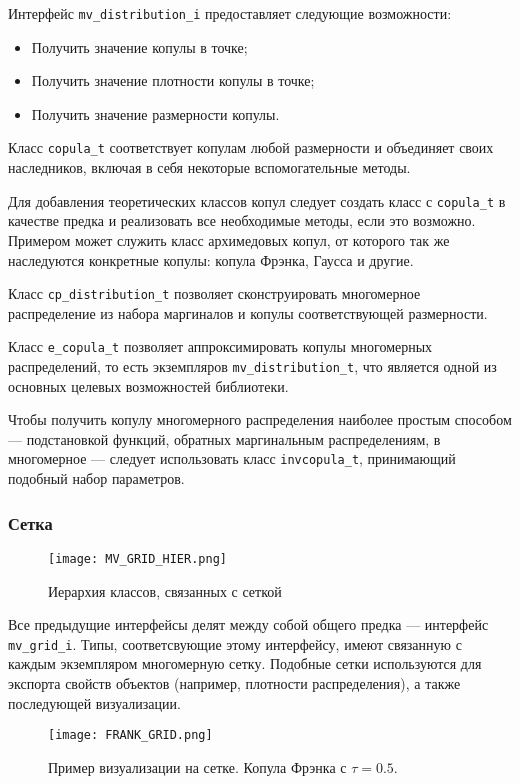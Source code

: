 Интерфейс \texttt{mv\_distribution\_i} предоставляет следующие возможности:
\begin{itemize}
  \item Получить значение копулы в точке;
  \item Получить значение плотности копулы в точке;
  \item Получить значение размерности копулы.
\end{itemize}

Класс \texttt{copula\_t} соответствует копулам любой размерности и объединяет своих наследников, включая в себя некоторые вспомогательные методы.

Для добавления теоретических классов копул следует создать класс с \texttt{copula\_t} в качестве предка и реализовать все необходимые методы, если это возможно. Примером может служить класс архимедовых копул, от которого так же наследуются конкретные копулы: копула Фрэнка, Гаусса и другие.

Класс \texttt{cp\_distribution\_t} позволяет сконструировать многомерное распределение из набора маргиналов и копулы соответствующей размерности.

Класс \texttt{e\_copula\_t} позволяет аппроксимировать копулы многомерных распределений, то есть экземпляров \texttt{mv\_distribution\_t}, что является одной из основных целевых возможностей библиотеки.

Чтобы получить копулу многомерного распределения наиболее простым способом --- подстановкой функций, обратных маргинальным распределениям, в многомерное --- следует использовать класс \texttt{invcopula\_t}, принимающий подобный набор параметров.

\subsubsection*{Сетка}

\begin{figure}[H]
  \centering
  \texttt{[image: MV\_GRID\_HIER.png]}
  \caption{Иерархия классов, связанных с сеткой}
\end{figure}

Все предыдущие интерфейсы делят между собой общего предка --- интерфейс \texttt{mv\_grid\_i}. Типы, соответсвующие этому интерфейсу, имеют связанную с каждым экземпляром многомерную сетку. Подобные сетки используются для экспорта свойств объектов (например, плотности распределения), а также последующей визуализации.

\begin{figure}[h]
	\centering
	\texttt{[image: FRANK\_GRID.png]}
	\caption{Пример визуализации на сетке. Копула Фрэнка с $\tau = 0.5$.}
\end{figure}


